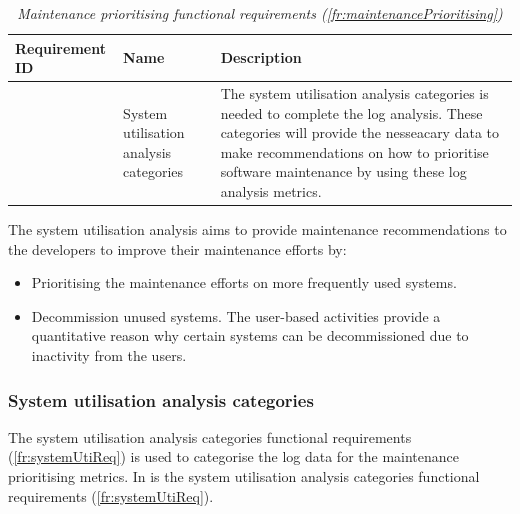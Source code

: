 \setcounter{phase}{4}
\setcounter{subphase}{0}
\begin{table}[!htb]
	\centering
	\caption[Maintenance prioritising functional requirements (\ref{fr:maintenancePrioritising})]
	{\textit{Maintenance prioritising functional requirements (\ref{fr:maintenancePrioritising})}}
	\label{tbl:ch2_maintenancePriortising}
	\begin{tabularx}{\textwidth}{|l|l|X|}
		\hline \textbf{Requirement ID} & \textbf{Name} & \textbf{Description} \\
		\hline \subphase{fr:systemUtiReq} & System utilisation analysis categories & \RaggedRight The system utilisation analysis categories is needed to complete the log analysis. These categories will provide the nesseacary data to make recommendations on how to prioritise software maintenance by using these log analysis metrics.\\
		\hline
	\end{tabularx}
\end{table}

The system utilisation analysis aims to provide maintenance recommendations to the developers to improve their maintenance efforts by:

\begin{itemize}
	\item Prioritising the maintenance efforts on more frequently used systems.
	\item Decommission unused systems. The user-based activities provide a quantitative reason why certain systems can be decommissioned due to inactivity from the users.
\end{itemize}

\subsubsection{System utilisation analysis categories}
The system utilisation analysis categories functional requirements (\ref{fr:systemUtiReq}) is used to categorise the log data for the maintenance prioritising metrics. In  is the system utilisation analysis categories functional requirements (\ref{fr:systemUtiReq}).

\clearpage

